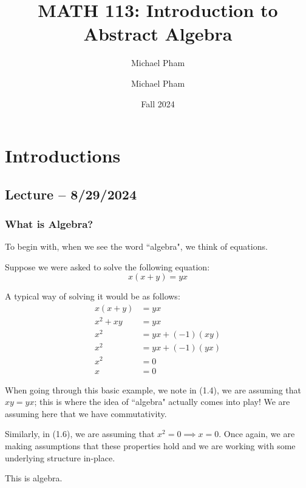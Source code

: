 \documentclass[openany]{book}
\title{#1}
\author{Michael Pham}
\date{#2}
\renewcommand{\mytitle}[2]{%
	\title{#1}
	\author{Michael Pham}
	\date{#2}
	\maketitle
	\newpage
	\mytoc
	\newpage
}
\begin{document}
\mytitle{MATH 113: Introduction to Abstract Algebra}{Fall 2024}

\chapter{Introductions}
\section{Lecture -- 8/29/2024}
\subsection{What is Algebra?}
To begin with, when we see the word ``algebra", we think of equations.

\begin{example}
	Suppose we were asked to solve the following equation:
	\begin{equation*}
		x(x+y) = yx
	\end{equation*}

	A typical way of solving it would be as follows:
	\begin{align}
		x(x+y) &= yx \\
		x^{2} + xy &= yx \\
		x^{2} &= yx + (-1)(xy) \\
		x^{2} &= yx + (-1)(yx) \\
		x^{2} &= 0 \\
		x &= 0
	\end{align}

	When going through this basic example, we note in (1.4), we are assuming that $xy = yx$; this is where the idea of ``algebra" actually comes into play! We are assuming here that we have commutativity.
	
	Similarly, in (1.6), we are assuming that $x^{2} = 0 \implies x = 0$. Once again, we are making assumptions that these properties hold and we are working with some underlying structure in-place.
	
	This is algebra.
\end{example}
\end{document}

